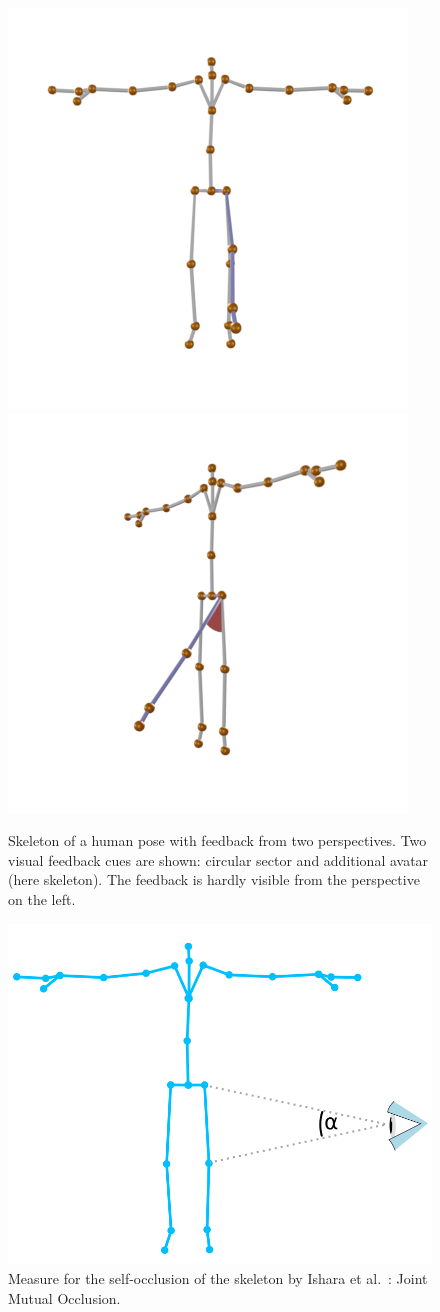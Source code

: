 \begin{figure}[ht]
	\centering
	\includegraphics[width=0.49\linewidth]{pictures/skeleton_feedback_front}
	\includegraphics[width=0.49\linewidth]{pictures/skeleton_feedback_side}
	\caption{Skeleton of a human pose with feedback from two perspectives. Two visual feedback cues are shown: circular sector and additional avatar (here skeleton). The feedback is hardly visible from the perspective on the left.}
	\label{fig:skeletonFeedbackPerspective}
\end{figure}

\begin{figure}[ht]
	\centering    \includegraphics[width=\linewidth]{pictures/skeleton_E_occ.png}
	\caption{Measure for the self-occlusion of the skeleton by Ishara et al.~\cite{ishara2015mra}: Joint Mutual Occlusion.}
	\label{fig:jmo}
\end{figure}


